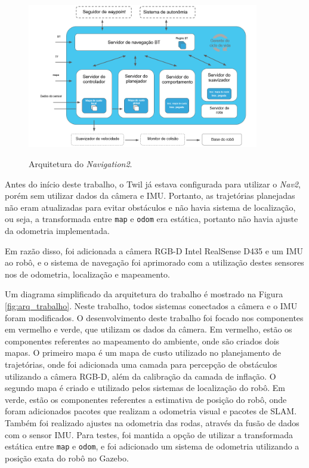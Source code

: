 \documentclass[repeatfields,xlists,xpacks,oneside,yearsonly]{ufrgscca}
\begin{document}
\begin{figure}[h]
    {
        \centering
        \caption{Arquitetura do \textit{Navigation2}.}
        \label{fig:nav2_arc}
        \includegraphics[width=0.9\textwidth]{nav2_architecture_trad.png}\\
    }
    {} %
\end{figure}

Antes do início deste trabalho, o Twil já estava configurada para
utilizar o \textit{Nav2}, porém sem utilizar dados da câmera e IMU.
Portanto, as trajetórias planejadas não eram atualizadas para evitar
obstáculos e não havia sistema de localização, ou seja, a
transformada entre \texttt{map} e \texttt{odom} era estática,
portanto não havia ajuste da odometria implementada.

Em razão disso, foi adicionada a câmera RGB-D Intel RealSense D435 e
um IMU ao robô, e o sistema de navegação foi aprimorado com a
utilização destes sensores nos de odometria, localização e
mapeamento.

Um diagrama simplificado da arquitetura do trabalho é mostrado na
Figura \ref{fig:arq_trabalho}. Neste trabalho, todos sistemas
conectados a câmera e o IMU foram modificados. O desenvolvimento
deste trabalho foi focado nos componentes em vermelho e verde, que
utilizam os dados da câmera. Em vermelho, estão os componentes
referentes ao mapeamento do ambiente, onde são criados dois mapas. O
primeiro mapa é um mapa de custo utilizado no planejamento de
trajetórias, onde foi adicionada uma camada para percepção de
obstáculos utilizando a câmera RGB-D, além da calibração da camada de
inflação. O segundo mapa é criado e utilizado pelos sistemas de
localização do robô. Em verde, estão os componentes referentes a
estimativa de posição do robô, onde foram adicionados pacotes que
realizam a odometria visual e pacotes de SLAM. Também foi realizado
ajustes na odometria das rodas, através da fusão de dados com o
sensor IMU. Para testes, foi mantida a opção de utilizar a
transformada estática entre \texttt{map} e \texttt{odom}, e foi
adicionado um sistema de odometria utilizando a posição exata do robô
no Gazebo.
\end{document}
